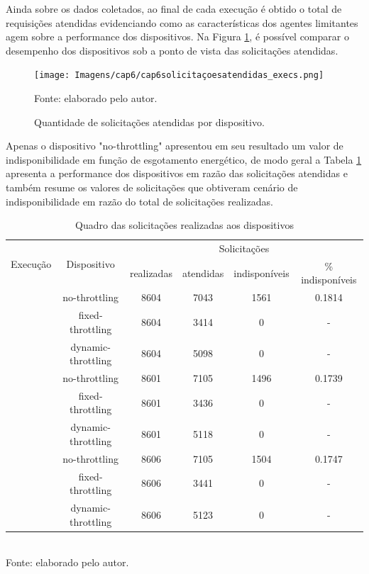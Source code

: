 Ainda sobre os dados coletados, ao final de cada execução é obtido o total de requisições atendidas evidenciando como as características dos agentes limitantes agem sobre a performance dos dispositivos. Na Figura \ref{fig:cap6solicitacoesatendidas}, é possível comparar o desempenho dos dispositivos sob a ponto de vista das solicitações atendidas.

\begin{figure}[H]
	\centering	
	\caption{Quantidade de solicitações atendidas por dispositivo.} 
	\label{fig:cap6solicitacoesatendidas}
	\noindent\texttt{[image: Imagens/cap6/cap6solicitaçoesatendidas\_execs.png]} 
	
	Fonte: elaborado pelo autor.
\end{figure}



Apenas o dispositivo "no-throttling" apresentou em seu resultado um valor de indisponibilidade em função de esgotamento energético, de modo geral a Tabela \ref{table:cap6:quadrogeralobtido} apresenta a performance dos dispositivos em razão das solicitações atendidas e também resume os valores de solicitações que obtiveram cenário de indisponibilidade em razão do total de solicitações realizadas.

\begingroup
\begin{table}[H]
	\centering
	\caption{Quadro das solicitações realizadas aos dispositivos}
	\begin{tabular}{|c|c|c|c|c|c|}
		\hline
		\multirow{2}{*}{Execução} & 
		\multirow{2}{*}{Dispositivo} &
		\multicolumn{4}{c|}{Solicitações}  \\\cline{3-6}\addlinespace[1pt]
		& & realizadas&  atendidas & indisponíveis  & \% indisponíveis \\
		\hline\addlinespace[1pt]
		\multirow{3}{*}{1} 	& no-throttling 	& 8604 &  7043	& 1561 	 	& 0.1814\\
							& fixed-throttling 	& 8604 &  3414	& 0 		& -\\
							& dynamic-throttling & 8604 & 5098 & 0 		&-\\
		\hdashline\addlinespace[1pt]
		\multirow{3}{*}{2}	& no-throttling 	& 8601 & 7105	& 1496  & 0.1739\\
							& fixed-throttling 	& 8601& 3436	& 0  & -\\
							& dynamic-throttling & 8601 & 5118	& 0  &-\\
		\hdashline\addlinespace[1pt]
	   \multirow{3}{*}{3}  & no-throttling & 8606 & 7105& 1504 &0.1747\\
	   	& fixed-throttling & 8606 &3441 & 0& -\\
	   	& dynamic-throttling & 8606 & 5123& 0&-\\
		\hline

	\end{tabular}
		\label{table:cap6:quadrogeralobtido}
		\\
		\footnotesize Fonte: elaborado pelo autor.
\end{table}
\endgroup

